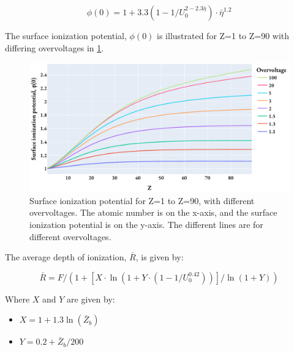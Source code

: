 \begin{equation}
    \label{eq:theory:quantitative:pap:phi_0}
    \phi(0) = 1 + 3.3 (1-1/U_0^{2 - 2.3 \bar{\eta}}) \cdot \bar{\eta}^{1.2}
\end{equation}


The surface ionization potential, $\phi(0)$ is illustrated for Z=1 to Z=90 with differing overvoltages in \cref{fig:pap:phi_0}.


\begin{figure}[htbp]
    \centering
    \includegraphics[width=0.8\linewidth]{figures/PAP_surface_ionization_potential.pdf}
    \caption{
        Surface ionization potential for Z=1 to Z=90, with different overvoltages.
        The atomic number is on the x-axis, and the surface ionization potential is on the y-axis.
        The different lines are for different overvoltages.
    }
    \label{fig:pap:phi_0}
\end{figure}

The average depth of ionization, $\bar{R}$, is given by:

\begin{equation}
    \label{eq:theory:quantitative:pap:R_bar}
    \bar{R} = F / (1 + [X \cdot \ln(1 + Y \cdot (1 - 1/U_0^{0.42}))]/\ln(1 + Y))
\end{equation}

Where $X$ and $Y$ are given by:

\begin{itemize}
    \item $ X = 1 + 1.3 \ln(\bar{Z}_b) $
    \item $ Y = 0.2 + \bar{Z}_b/200 $
\end{itemize}




